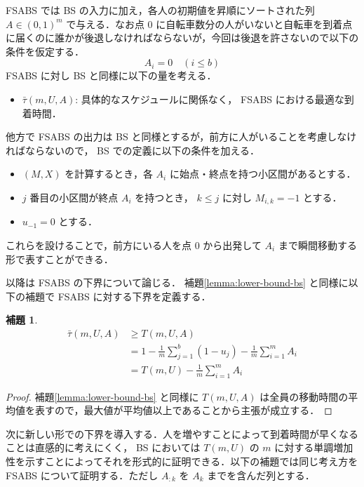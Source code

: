 \documentclass[11pt,a4paper]{jarticle}
\newtheorem{lemma}{補題}
\newcommand\lemref[1]{補題\ref{lemma:#1}}
\begin{document}
FSABS では BS の入力に加え，各人の初期値を昇順にソートされた列 $A \in {(0, 1)}^m$ で与える．なお点 0 に自転車数分の人がいないと自転車を到着点に届くのに誰かが後退しなければならないが，今回は後退を許さないので以下の条件を仮定する．
\begin{equation}
  A_i = 0\quad (i \leq b)
\end{equation}
FSABS に対し BS と同様に以下の量を考える．
\begin{itemize}
\item $\bar\tau(m, U, A)$: 具体的なスケジュールに関係なく， FSABS における最適な到着時間．
\end{itemize}
他方で FSABS の出力は BS と同様とするが，前方に人がいることを考慮しなければならないので， BS での定義に以下の条件を加える．
\begin{itemize}
\item $(M, X)$ を計算するとき，各 $A_i$ に始点・終点を持つ小区間があるとする．
\item $j$ 番目の小区間が終点 $A_i$ を持つとき， $k \leq j$ に対し $M_{i,k} = -1$ とする．
\item $u_{-1} = 0$ とする．
\end{itemize}
これらを設けることで，前方にいる人を点 0 から出発して $A_i$ まで瞬間移動する形で表すことができる．

以降は FSABS の下界について論じる． \lemref{lower-bound-bs} と同様に以下の補題で FSABS に対する下界を定義する．
\begin{lemma}
  \begin{align}
    \bar\tau(m, U, A) &\geq T(m, U, A) \\
                      &= 1 - \frac{1}{m}\sum_{j = 1}^b (1 - u_j) - \frac{1}{m}\sum_{i = 1}^{m} A_i \\
                      &= T(m, U) - \frac{1}{m}\sum_{i = 1}^{m} A_i
  \end{align}
\end{lemma}
\begin{proof}
  \lemref{lower-bound-bs} と同様に $T(m, U, A)$ は全員の移動時間の平均値を表すので，最大値が平均値以上であることから主張が成立する．
\end{proof}

次に新しい形での下界を導入する．人を増やすことによって到着時間が早くなることは直感的に考えにくく， BS においては $T(m, U)$ の $m$ に対する単調増加性を示すことによってそれを形式的に証明できる．以下の補題では同じ考え方を FSABS について証明する．ただし $A_{:k}$ を $A_k$ までを含んだ列とする．
\end{document}
